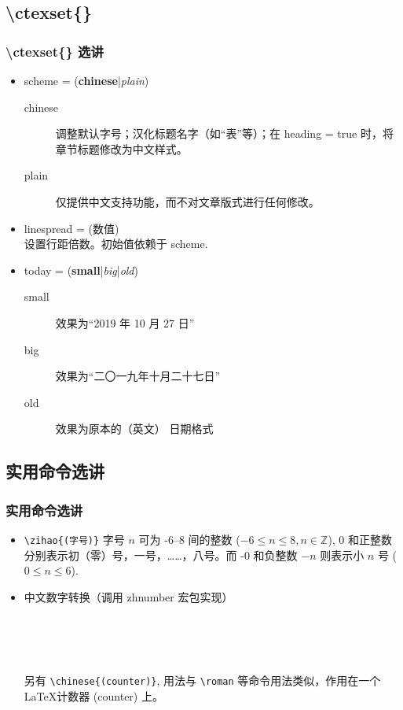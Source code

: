 \documentclass[final,aspectratio=169]{ctexbeamer}
\begin{document}
\subsection{\textbackslash ctexset\{\}}
\begin{frame}
\frametitle{\textbackslash ctexset\{\} 选讲}
\begin{itemize}
  \item scheme = (\textbf{chinese}|\emph{plain})
  \begin{description}
    \item[chinese] 调整默认字号；汉化标题名字（如“表”等）；在 heading = true 时，将章节标题修改为中文样式。
    \item[plain] 仅提供中文支持功能，而不对文章版式进行任何修改。
  \end{description}
\item linespread = (数值)\\
设置行距倍数。初始值依赖于 scheme.
\item today = (\textbf{small}|\emph{big}|\emph{old})
\begin{description}
  \item[small] 效果为“2019 年 10 月 27 日”
  \item[big] 效果为“二〇一九年十月二十七日”
  \item[old] 效果为原本的（英文） 日期格式 
\end{description}
\end{itemize}
\end{frame}

\subsection{实用命令选讲}\label{sec:practical-options}
\begin{frame}[fragile]
\frametitle{实用命令选讲}
\begin{itemize}
\item \verb|\zihao{(字号)}| 字号 $n$ 可为 -6--8 间的整数 ($-6 \leq n \leq 8, n \in \mathbb{Z}$), 0 和正整数分别表示初（零）号，一号，……，八号。而 -0 和负整数 $-n$ 则表示小 $n$ 号 ($0 \leq n \leq 6$).
\item 中文数字转换（调用 zhnumber 宏包实现） %
\begin{sidelst}
 \\
 \\
 \\
\end{sidelst}
另有 \verb|\chinese{(counter)}|, 用法与 \verb|\roman| 等命令用法类似，作用在一个 \LaTeX 计数器 (counter) 上。
\end{itemize}
\end{frame}
\end{document}
